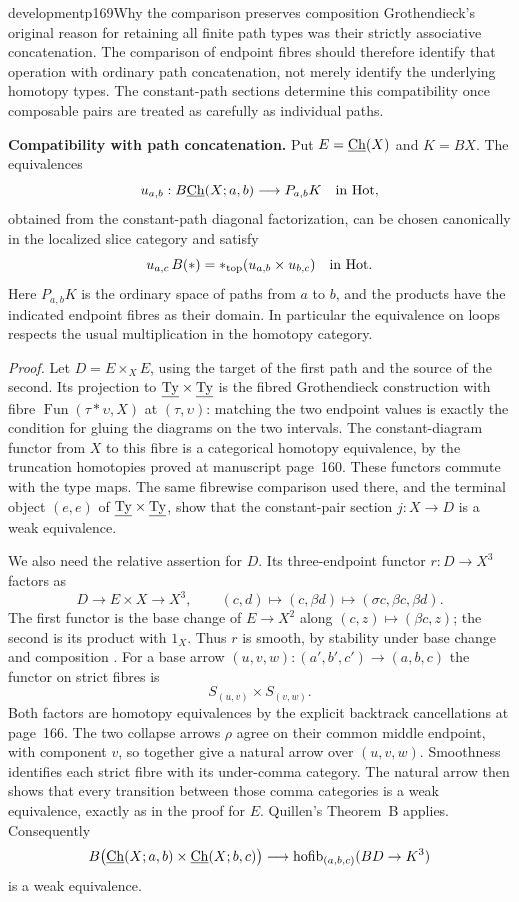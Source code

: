 \begin{dcomment}{development}{p169}{Why the comparison preserves composition}
Grothendieck's original reason for retaining all finite path types was their strictly associative concatenation. The comparison of endpoint fibres should therefore identify that operation with ordinary path concatenation, not merely identify the underlying homotopy types. The constant-path sections determine this compatibility once composable pairs are treated as carefully as individual paths.

\textbf{Compatibility with path concatenation.}\ours\quad
Put $E=\underline{\mathrm{Ch}}(X)$ and $K=BX$. The equivalences
\[
 u_{a,b}:B\underline{\mathrm{Ch}}(X;a,b)\longrightarrow P_{a,b}K
 \quad\hbox{in }\mathrm{Hot},
\]
obtained from the constant-path diagonal factorization, can be chosen canonically in the localized slice category and satisfy
\[
 u_{a,c}\,B(\mathord{*})
   =\mathord{*}_{\mathrm{top}}(u_{a,b}\times u_{b,c})
 \quad\hbox{in }\mathrm{Hot}.
\]
Here $P_{a,b}K$ is the ordinary space of paths from $a$ to $b$, and the products have the indicated endpoint fibres as their domain. In particular the equivalence on loops respects the usual multiplication in the homotopy category.

\emph{Proof.} Let $D=E\times_{X}E$, using the target of the first path and the source of the second. Its projection to $\underline{\mathrm{Ty}}\times\underline{\mathrm{Ty}}$ is the fibred Grothendieck construction with fibre
$\operatorname{Fun}(\tau*\upsilon,X)$ at $(\tau,\upsilon)$: matching the two endpoint values is exactly the condition for gluing the diagrams on the two intervals. The constant-diagram functor from $X$ to this fibre is a categorical homotopy equivalence, by the truncation homotopies proved at manuscript page~160. These functors commute with the type maps. The same fibrewise comparison used there, and the terminal object $(e,e)$ of $\underline{\mathrm{Ty}}\times\underline{\mathrm{Ty}}$, show that the constant-pair section $j:X\to D$ is a weak equivalence.

We also need the relative assertion for $D$. Its three-endpoint functor $r:D\to X^3$ factors as
\[
 D\longrightarrow E\times X\longrightarrow X^3,
 \qquad
 (c,d)\longmapsto(c,\beta d)
       \longmapsto(\sigma c,\beta c,\beta d).
\]
The first functor is the base change of $E\to X^2$ along $(c,z)\mapsto(\beta c,z)$; the second is its product with $1_X$. Thus $r$ is smooth, by stability under base change and composition \citep[Proposition~4.7]{Maltsiniotis2005Asphericite}. For a base arrow $(u,v,w):(a',b',c')\to(a,b,c)$ the functor on strict fibres is
\[
 S_{(u,v)}\times S_{(v,w)}.
\]
Both factors are homotopy equivalences by the explicit backtrack cancellations at page~166. The two collapse arrows $\rho$ agree on their common middle endpoint, with component $v$, so together give a natural arrow over $(u,v,w)$. Smoothness identifies each strict fibre with its under-comma category. The natural arrow then shows that every transition between those comma categories is a weak equivalence, exactly as in the proof for $E$. Quillen's Theorem~B applies. Consequently
\[
 B\bigl(\underline{\mathrm{Ch}}(X;a,b)\times\underline{\mathrm{Ch}}(X;b,c)\bigr)
     \longrightarrow\operatorname{hofib}_{(a,b,c)}(BD\to K^3)
\]
is a weak equivalence.


\end{dcomment}
